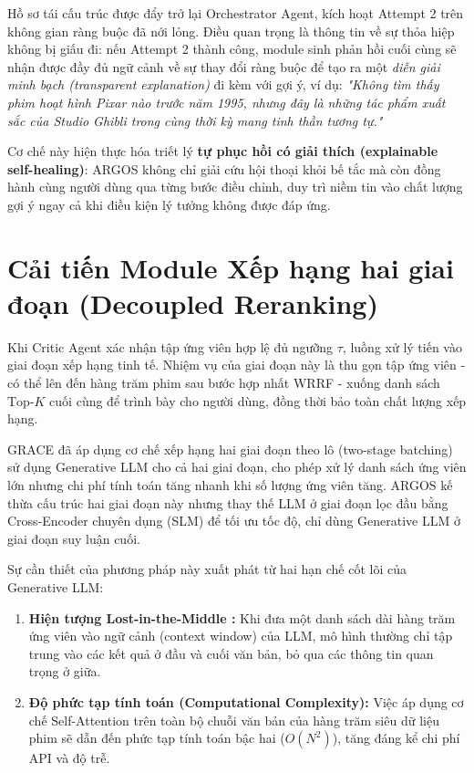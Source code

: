 Hồ sơ tái cấu trúc được đẩy trở lại Orchestrator Agent, kích hoạt Attempt 2 trên không gian ràng buộc đã nới lỏng. Điều quan trọng là thông tin về sự thỏa hiệp không bị giấu đi: nếu Attempt 2 thành công, module sinh phản hồi cuối cùng sẽ nhận được đầy đủ ngữ cảnh về sự thay đổi ràng buộc để tạo ra một \textit{diễn giải minh bạch (transparent explanation)} đi kèm với gợi ý, ví dụ: \textit{"Không tìm thấy phim hoạt hình Pixar nào trước năm 1995, nhưng đây là những tác phẩm xuất sắc của Studio Ghibli trong cùng thời kỳ mang tinh thần tương tự."}

Cơ chế này hiện thực hóa triết lý \textbf{tự phục hồi có giải thích (explainable self-healing)}: ARGOS không chỉ giải cứu hội thoại khỏi bế tắc mà còn đồng hành cùng người dùng qua từng bước điều chỉnh, duy trì niềm tin vào chất lượng gợi ý ngay cả khi điều kiện lý tưởng không được đáp ứng.

\section{Cải tiến Module Xếp hạng hai giai đoạn (Decoupled Reranking)}
Khi Critic Agent xác nhận tập ứng viên hợp lệ đủ ngưỡng $\tau$, luồng xử lý tiến vào giai đoạn xếp hạng tinh tế. Nhiệm vụ của giai đoạn này là thu gọn tập ứng viên - có thể lên đến hàng trăm phim sau bước hợp nhất WRRF - xuống danh sách $\text{Top-}K$ cuối cùng để trình bày cho người dùng, đồng thời bảo toàn chất lượng xếp hạng.

GRACE đã áp dụng cơ chế xếp hạng hai giai đoạn theo lô (two-stage batching) sử dụng Generative LLM cho cả hai giai đoạn, cho phép xử lý danh sách ứng viên lớn nhưng chi phí tính toán tăng nhanh khi số lượng ứng viên tăng. ARGOS kế thừa cấu trúc hai giai đoạn này nhưng thay thế LLM ở giai đoạn lọc đầu bằng Cross-Encoder chuyên dụng (SLM) để tối ưu tốc độ, chỉ dùng Generative LLM ở giai đoạn suy luận cuối.

Sự cần thiết của phương pháp này xuất phát từ hai hạn chế cốt lõi của Generative LLM:
\begin{enumerate}
    \item \textbf{Hiện tượng Lost-in-the-Middle \cite{liu-etal-2024-lost}:} Khi đưa một danh sách dài hàng trăm ứng viên vào ngữ cảnh (context window) của LLM, mô hình thường chỉ tập trung vào các kết quả ở đầu và cuối văn bản, bỏ qua các thông tin quan trọng ở giữa.
    \item \textbf{Độ phức tạp tính toán (Computational Complexity):} Việc áp dụng cơ chế Self-Attention trên toàn bộ chuỗi văn bản của hàng trăm siêu dữ liệu phim sẽ dẫn đến phức tạp tính toán bậc hai ($O(N^2)$), tăng đáng kể chi phí API và độ trễ.
\end{enumerate}

